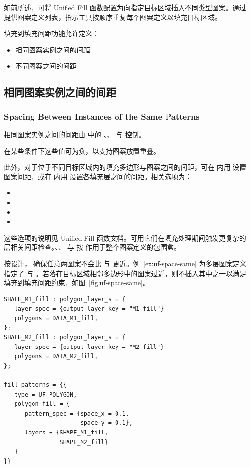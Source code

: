 如前所述，可将 Unified Fill 函数配置为向指定目标区域插入不同类型图案。通过提供图案定义列表，指示工具按顺序重复每个图案定义以填充目标区域。

填充到填充间距功能允许定义：
\begin{itemize}
  \item 相同图案实例之间的间距
  \item 不同图案之间的间距
\end{itemize}

\subsection{相同图案实例之间的间距}
\subsubsection*{Spacing Between Instances of the Same Patterns}

相同图案实例之间的间距由  中的 、、 与  控制。

\begin{noteBox}
在某些条件下这些值可为负，以支持图案放置重叠。
\end{noteBox}

此外，对于位于不同目标区域内的填充多边形与图案之间的间距，可在  内用  设置图案间距，或在  内用  设置各填充层之间的间距。相关选项为：
\begin{itemize}
  \item {}
  \item {}
  \item {}
  \item {}
\end{itemize}
这些选项的说明见 Unified Fill 函数文档。可用它们在填充处理期间触发更复杂的层相关间距检查。、、 与  按  作用于整个图案定义的包围盒。

按设计， 确保任意两图案不会比  与  更近。例~\ref{ex:uf-space-same} 为多层图案定义指定了  与 。若落在目标区域相邻多边形中的图案过近，则不插入其中之一以满足填充到填充间距约束，如图~\ref{fig:uf-space-same}。

\begin{lstlisting}[style=pxl,caption={使用 space\_x 与 space\_y 的相同图案间距},label={ex:uf-space-same}]
SHAPE_M1_fill : polygon_layer_s = {
   layer_spec = {output_layer_key = "M1_fill"}
   polygons = DATA_M1_fill,
};
SHAPE_M2_fill : polygon_layer_s = {
   layer_spec = {output_layer_key = "M2_fill"}
   polygons = DATA_M2_fill,
};

fill_patterns = {{
   type = UF_POLYGON,
   polygon_fill = {
      pattern_spec = {space_x = 0.1,
                      space_y = 0.1},
      layers = {SHAPE_M1_fill,
                SHAPE_M2_fill}
   }
}}
\end{lstlisting}


